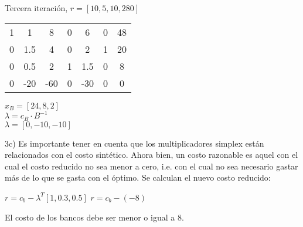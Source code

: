 \documentclass[10pt]{article}
\begin{document}
Tercera iteraci\'on, $r=[10, 5, 10, 280]$

\begin{center}
\begin{tabular}{c c c | c c c c}
1&	1	&8		&	0&	6	&0&	48\\
0&	1.5	&4		&	0&	2	&1	&20\\
0&	0.5	&2		&	1&	1.5&0&	8\\
								
								
0&	-20&	-60		&	0	&-30&	0&	0\\
\end{tabular}
\end{center}

\begin{center}
$x_B = [24,8, 2]$\\
$\lambda = c_B \cdot B^{-1}$\\
$\lambda = [0, -10, -10]$\\
\end{center}

3c) Es importante tener en cuenta que los multiplicadores simplex est\'an relacionados con el costo sint\'etico. Ahora bien, un costo razonable es aquel con el cual el costo reducido no sea menor a cero, i.e. con el cual no sea necesario gastar m\'as de lo que se gasta con el \'optimo. Se calculan el nuevo costo reducido:

$r=c_b- \lambda^T[1, 0.3, 0.5]$
$r=c_b-(-8)$
 
El costo de los bancos debe ser menor o igual a 8.
\end{document}
